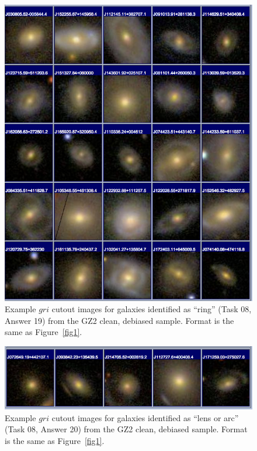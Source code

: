 \documentclass[useAMS,usenatbib]{mn2e}
\begin{document}
\newpage
\clearpage
\begin{figure}
\includegraphics[angle=0,width=7.0in]{figures/gallery/ring.png}
\caption{Example $gri$ cutout images for galaxies identified as ``ring'' (Task 08, Answer 19) from the GZ2 clean, debiased sample. Format is the same as Figure~\ref{fig1}.}
\end{figure}

\newpage
\clearpage
\begin{figure}
\includegraphics[angle=0,width=7.0in]{figures/gallery/lens.png}
\caption{Example $gri$ cutout images for galaxies identified as ``lens or arc'' (Task 08, Answer 20) from the GZ2 clean, debiased sample. Format is the same as Figure~\ref{fig1}.}
\end{figure}
\end{document}
